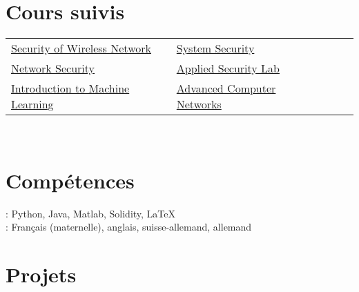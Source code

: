 \documentclass[mm]{simple_style}
\begin{document}
\begin{resume}
\section{Cours suivis}
    \begin{tabular}{lllll}
        \href{http://www.syssec.ethz.ch/education/sown/sown_AS16.html}{Security of Wireless Network} & \href{http://www.syssec.ethz.ch/education/system_security/system_security_as16.html}{System Security}\\
        \href{https://netsec.ethz.ch/courses/netsec-2016/}{Network Security} & \href{http://www.infsec.ethz.ch/education/as2016.html}{Applied Security Lab} \\
        \href{https://www.cs.cmu.edu/~10601b/}{Introduction to Machine Learning} & \href{https://ndal.ethz.ch/courses/acn.html}{Advanced Computer Networks}\\
    \end{tabular}\\
\sectionline
\section{Comp\'etences}
: Python, Java, Matlab, Solidity, \LaTeX\\
: Fran\c{c}ais (maternelle), anglais, suisse-allemand, allemand\\
\sectionline
\section{Projets}


\end{resume}
\end{document}
